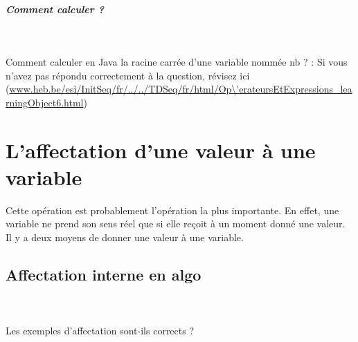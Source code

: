 \documentclass[11pt,a4paper]{article}
\begin{document}
			
		\subparagraph{Comment calculer ?} 
		
                \textcolor{white}{.} \par
            Comment calculer en Java
                la racine carr\'ee d'une variable nomm\'ee nb ? :  \textcolor{gray}{\underline{\hspace*{10em}}} Si vous n'avez pas r\'epondu correctement \`a la question, 
          r\'evisez ici (\url{www.heb.be/esi/InitSeq/fr/../../TDSeq/fr/html/Op\'erateursEtExpressions\_learningObject6.html})
            \par
        \section{L'affectation d'une valeur \`a une variable}
				Cette op\'eration est probablement l'op\'eration la plus importante. En effet, une variable ne
        prend son sens r\'eel que si elle re\c coit \`a un moment donn\'e une valeur. Il y a deux moyens de
        donner une valeur \`a une variable.
      
            \par
        \subsection{Affectation interne en algo}
			
		\subparagraph{} 
		
                \textcolor{white}{.} \par
            Les exemples d'affectation sont-ils corrects ?
						
\end{document}
